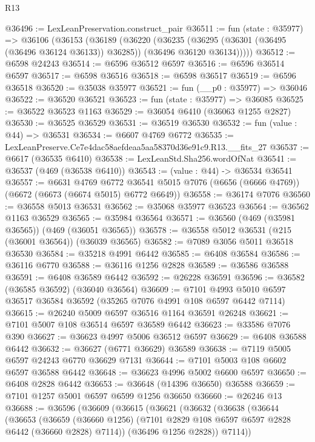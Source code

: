\begin{lexlean}{R13}
\begin{coremodule}
@36496 := LexLeanPreservation.construct_pair
@36511 := fun (state : @35977) =>
  @36106
    (@36153
      (@36189
        (@36220
          (@36235
            (@36295 (@36301 (@36495 (@36496 @36124 @36133)) @36285))
            (@36496 @36120 @36134)))))
@36512 := @6598 @24243
@36514 := @6596 @36512 @6597
@36516 := @6596 @36514 @6597
@36517 := @6598 @36516
@36518 := @6598 @36517
@36519 := @6596 @36518
@36520 := @35038 @35977
@36521 := fun (__p0 : @35977) => @36046
@36522 := @36520 @36521
@36523 := fun (state : @35977) => @36085
@36525 := @36522 @36523 @1163
@36529 := @36054 @6410 (@36063 @1255 @2827)
@36530 := @36525 @36529
@36531 := @36519 @36530
@36532 := fun (value : @44) => @36531
@36534 := @6607 @4769 @6772
@36535 := LexLeanPreserve.Ce7e4dac58aefdeaa5aa58370d36e91c9.R13.__fits_27
@36537 := @6617 (@36535 @6410)
@36538 := LexLeanStd.Sha256.wordOfNat
@36541 := @36537 (@469 (@36538 @6410))
@36543 := (value : @44) -> @36534 @36541
@36557 := @6631
    @4769
    @6772
    @36541
    @5015
    @7076
    (@6656 (@6666 @4769))
    (@6672 (@6673 (@6674 @5015) @6772 @6649))
@36558 := @36174 @7076
@36560 := @36558 @5013 @36531
@36562 := @35068 @35977 @36523
@36564 := @36562 @1163 @36529
@36565 := @35984 @36564
@36571 := @36560 (@469 (@35981 @36565)) (@469 (@36051 @36565))
@36578 := @36558 @5012 @36531 (@215 (@36001 @36564)) (@36039 @36565)
@36582 := @7089 @3056 @5011 @36518 @36530
@36584 := @35218 @4991 @6442
@36585 := @6408 @36584
@36586 := @36116 @6770
@36588 := @36116 @1256 @2828
@36589 := @36586 @36588
@36591 := @6408 @36589 @6442
@36592 := @26228 @36591
@36596 := @36582 (@36585 @36592) (@36040 @36564)
@36609 := @7101 @4993 @5010 @6597 @36517 @36584 @36592 (@35265 @7076 @4991 @108 @6597 @6442 @7114)
@36615 := @26240 @5009 @6597 @36516 @1164 @36591 @26248
@36621 := @7101 @5007 @108 @36514 @6597 @36589 @6442
@36623 := @33586 @7076 @390
@36627 := @36623 @4997 @5006 @36512 @6597
@36629 := @6408 @36588 @6442
@36632 := @36627 (@6771 @36629) @36589
@36638 := @7119 @5005 @6597 @24243 @6770 @36629 @7131
@36644 := @7101 @5003 @108 @6602 @6597 @36588 @6442
@36648 := @36623 @4996 @5002 @6600 @6597
@36650 := @6408 @2828 @6442
@36653 := @36648 (@14396 @36650) @36588
@36659 := @7101 @1257 @5001 @6597 @6599 @1256 @36650
@36660 := @26246 @13
@36688 := @36596
    (@36609
      (@36615
        (@36621
          (@36632
            (@36638
              (@36644
                (@36653
                  (@36659
                    (@36660 @1256)
                    (@7101 @2829 @108 @6597 @6597 @2828 @6442 (@36660 @2828) @7114))
                  (@36496 @1256 @2828))
                @7114))

\end{coremodule}
\end{lexlean}
